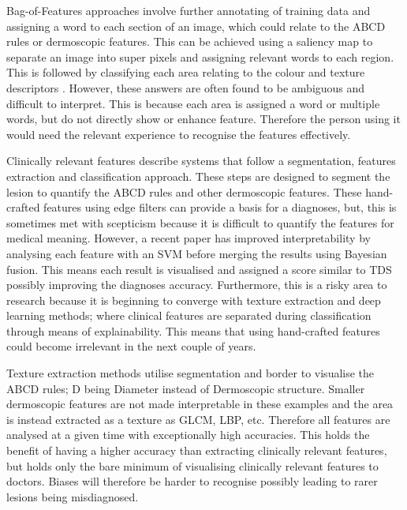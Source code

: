 \documentclass[12pt]{report}
\begin{document}
Bag-of-Features approaches involve further annotating of training data and assigning a word to each section of an image, which could relate to the ABCD rules or dermoscopic features. This can be achieved using a saliency map to separate an image into super pixels and assigning relevant words to each region. This is followed by classifying each area relating to the colour and texture descriptors \cite{Barata2013}. However, these answers are often found to be ambiguous and difficult to interpret. This is because each area is assigned a word or multiple words, but do not directly show or enhance feature. Therefore the person using it would need the relevant experience to recognise the features effectively.

Clinically relevant features describe systems that follow a segmentation, features extraction and classification\cite{Vocaturo2019} approach. These steps are designed to segment the lesion to quantify the ABCD rules\cite{Bakheet2017, Filali2019} and other dermoscopic features. These hand-crafted features using edge filters can provide a basis for a diagnoses, but, this is sometimes met with scepticism because it is difficult to quantify the features for medical meaning. However, a recent paper has improved interpretability by analysing each feature with an SVM before merging the results using Bayesian fusion. This means each result is visualised and assigned a score similar to TDS possibly improving the diagnoses accuracy. Furthermore, this is a risky area to research because it is beginning to converge with texture extraction and deep learning methods; where clinical features are separated during classification through means of explainability. This means that using hand-crafted features could become irrelevant in the next couple of years.

Texture extraction methods utilise segmentation and border to visualise the ABCD rules; D being Diameter instead of Dermoscopic structure. Smaller dermoscopic features are not made interpretable in these examples and the area is instead extracted as a texture as GLCM, LBP, etc. Therefore all features are analysed at a given time with exceptionally high accuracies. This holds the benefit of having a higher accuracy than extracting clinically relevant features, but holds only the bare minimum of visualising clinically relevant features to doctors. Biases will therefore be harder to recognise possibly leading to rarer lesions being misdiagnosed.
\end{document}
